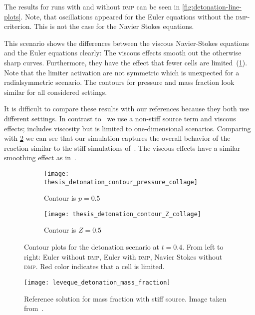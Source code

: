 The results for runs with and without \textsc{dmp} can be seen in \cref{fig:detonation-line-plots}.
Note, that oscillations appeared for the Euler equations without the \textsc{dmp}-criterion.
This is not the case for the Navier Stokes equations.

This scenario shows the differences between the viscous Navier-Stokes equations and the Euler equations clearly:
The viscous effects smooth out the otherwise sharp curves.
Furthermore, they have the effect that fewer cells are limited~(\cref{fig:detonation-pressure-contour}).
Note that the limiter activation are not symmetric which is unexpected for a radialsymmetric scenario.
The contours for pressure and mass fraction look similar for all considered settings.

It is difficult to compare these results with our references because they both use different settings.
In contrast to~\cite{helzel2000modified} we use a non-stiff source term and viscous effects; \cite{hidalgo2011ader} includes viscosity but is limited to one-dimensional scenarios.
Comparing with \cref{fig:detonation-contour-reference} we can see that our simulation captures the overall behavior of the reaction similar to the stiff simulations of~\cite{helzel2000modified}.
The viscous effects have a similar smoothing effect as in~\cite{hidalgo2011ader}.
\begin{figure}[htb!]
  \centering
  \begin{subfigure}[t]{1.0\textwidth}
    \centering
  \texttt{[image: thesis\_detonation\_contour\_pressure\_collage]} 
  \caption{Contour is $p = 0.5$}
  \end{subfigure}
  \begin{subfigure}[t]{1.0\textwidth}
    \centering
  \texttt{[image: thesis\_detonation\_contour\_Z\_collage]} 
  \caption{Contour is $Z = 0.5$}
  \end{subfigure}
  \caption{\label{fig:detonation-pressure-contour}%
    Contour plots for the detonation scenario at $t=0.4$.
    From left to right: Euler without \textsc{dmp}, Euler with \textsc{dmp}, Navier Stokes without \textsc{dmp}.
    Red color indicates that a cell is limited.
  }
\end{figure}
\begin{figure}[htb]
    \centering
    \texttt{[image: leveque\_detonation\_mass\_fraction]}
    \caption{\label{fig:detonation-contour-reference}Reference solution for mass fraction with stiff source.
      Image taken from~\cite{helzel2000modified}.}
\end{figure}


